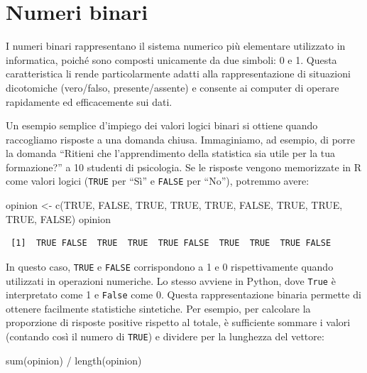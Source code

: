 \documentclass[
  italian,
  letterpaper,
  a4paper,
  11pt,
  open=any]{scrbook}
\newenvironment{Shaded}{\begin{snugshade}}{\end{snugshade}}
\newcommand{\ConstantTok}[1]{\textcolor[rgb]{0.56,0.35,0.01}{#1}}
\newcommand{\FunctionTok}[1]{\textcolor[rgb]{0.28,0.35,0.67}{#1}}
\newcommand{\NormalTok}[1]{\textcolor[rgb]{0.00,0.23,0.31}{#1}}
\newcommand{\OtherTok}[1]{\textcolor[rgb]{0.00,0.23,0.31}{#1}}
\newcommand{\SpecialCharTok}[1]{\textcolor[rgb]{0.37,0.37,0.37}{#1}}
\theoremstyle{plain}
\theoremstyle{definition}
\theoremstyle{definition}
\theoremstyle{remark}
\begin{document}
\section{Numeri binari}\label{numeri-binari}

I numeri binari rappresentano il sistema numerico più elementare
utilizzato in informatica, poiché sono composti unicamente da due
simboli: 0 e 1. Questa caratteristica li rende particolarmente adatti
alla rappresentazione di situazioni dicotomiche (vero/falso,
presente/assente) e consente ai computer di operare rapidamente ed
efficacemente sui dati.

Un esempio semplice d'impiego dei valori logici binari si ottiene quando
raccogliamo risposte a una domanda chiusa. Immaginiamo, ad esempio, di
porre la domanda ``Ritieni che l'apprendimento della statistica sia
utile per la tua formazione?'' a 10 studenti di psicologia. Se le
risposte vengono memorizzate in R come valori logici (\texttt{TRUE} per
``Sì'' e \texttt{FALSE} per ``No''), potremmo avere:

\begin{Shaded}
\begin{Highlighting}[]
\NormalTok{opinion }\OtherTok{\textless{}{-}} \FunctionTok{c}\NormalTok{(}\ConstantTok{TRUE}\NormalTok{, }\ConstantTok{FALSE}\NormalTok{, }\ConstantTok{TRUE}\NormalTok{, }\ConstantTok{TRUE}\NormalTok{, }\ConstantTok{TRUE}\NormalTok{, }\ConstantTok{FALSE}\NormalTok{, }\ConstantTok{TRUE}\NormalTok{, }\ConstantTok{TRUE}\NormalTok{, }\ConstantTok{TRUE}\NormalTok{, }\ConstantTok{FALSE}\NormalTok{)}
\NormalTok{opinion}
\end{Highlighting}
\end{Shaded}

\begin{verbatim}
 [1]  TRUE FALSE  TRUE  TRUE  TRUE FALSE  TRUE  TRUE  TRUE FALSE
\end{verbatim}

In questo caso, \texttt{TRUE} e \texttt{FALSE} corrispondono a 1 e 0
rispettivamente quando utilizzati in operazioni numeriche. Lo stesso
avviene in Python, dove \texttt{True} è interpretato come 1 e
\texttt{False} come 0. Questa rappresentazione binaria permette di
ottenere facilmente statistiche sintetiche. Per esempio, per calcolare
la proporzione di risposte positive rispetto al totale, è sufficiente
sommare i valori (contando così il numero di \texttt{TRUE}) e dividere
per la lunghezza del vettore:

\begin{Shaded}
\begin{Highlighting}[]
\FunctionTok{sum}\NormalTok{(opinion) }\SpecialCharTok{/} \FunctionTok{length}\NormalTok{(opinion)}
\end{Highlighting}
\end{Shaded}
\end{document}
